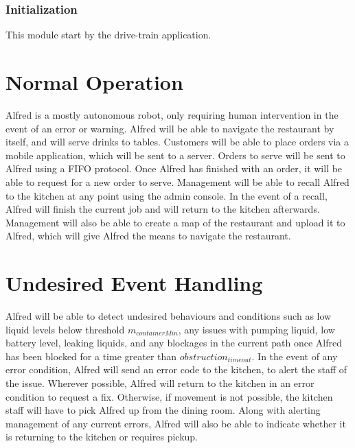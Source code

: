 \documentclass [10pt]{article}
\begin{document}
\subsubsection{Initialization}
This module start by the drive-train application.


\section{Normal Operation}
Alfred is a mostly autonomous robot, only requiring human intervention in the event of an error or warning. Alfred will be able to navigate the restaurant by itself, and will serve drinks to tables. Customers will be able to place orders via a mobile application, which will be sent to a server. Orders to serve will be sent to Alfred using a FIFO protocol. Once Alfred has finished with an order, it will be able to request for a new order to serve. Management will be able to recall Alfred to the kitchen at any point using the admin console. In the event of a recall, Alfred will finish the current job and will return to the kitchen afterwards. Management will also be able to create a map of the restaurant and upload it to Alfred, which will give Alfred the means to navigate the restaurant.



\section{Undesired Event Handling}
Alfred will be able to detect undesired behaviours and conditions such as low liquid levels below threshold $ m_{containerMin} $, any issues with pumping liquid, low battery level, leaking liquids, and any blockages in the current path once Alfred has been blocked for a time greater than $ obstruction_{timeout} $. In the event of any error condition, Alfred will send an error code to the kitchen, to alert the staff of the issue. Wherever possible, Alfred will return to the kitchen in an error condition to request a fix. Otherwise, if movement is not possible, the kitchen staff will have to pick Alfred up from the dining room. Along with alerting management of any current errors, Alfred will also be able to indicate whether it is returning to the kitchen or requires pickup.
\end{document}
